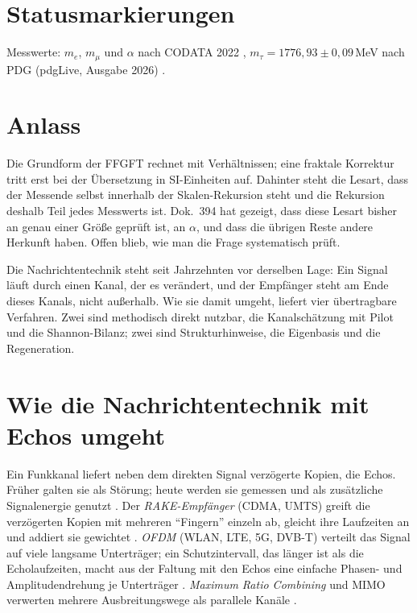 \section*{Statusmarkierungen}

Messwerte: $m_e$, $m_\mu$ und $\alpha$ nach CODATA 2022 \QM, $m_\tau=1776{,}93\pm0{,}09$\,MeV nach PDG
(pdgLive, Ausgabe 2026) \QM.

\section{Anlass}

Die Grundform der FFGFT rechnet mit Verhältnissen; eine fraktale Korrektur tritt erst bei der
Übersetzung in SI-Einheiten auf. Dahinter steht die Lesart, dass der Messende selbst innerhalb der
Skalen-Rekursion steht und die Rekursion deshalb Teil jedes Messwerts ist. Dok.~394 hat gezeigt, dass
diese Lesart bisher an genau einer Größe geprüft ist, an $\alpha$, und dass die übrigen Reste andere
Herkunft haben. Offen blieb, wie man die Frage systematisch prüft.

Die Nachrichtentechnik steht seit Jahrzehnten vor derselben Lage: Ein Signal läuft durch einen Kanal,
der es verändert, und der Empfänger steht am Ende dieses Kanals, nicht außerhalb. Wie sie damit
umgeht, liefert vier übertragbare Verfahren. Zwei sind methodisch direkt nutzbar, die Kanalschätzung
mit Pilot und die Shannon-Bilanz; zwei sind Strukturhinweise, die Eigenbasis und die Regeneration.

\section{Wie die Nachrichtentechnik mit Echos umgeht}

Ein Funkkanal liefert neben dem direkten Signal verzögerte Kopien, die Echos. Früher galten sie als
Störung; heute werden sie gemessen und als zusätzliche Signalenergie genutzt \QM. Der
\emph{RAKE-Empfänger} (CDMA, UMTS) greift die verzögerten Kopien mit mehreren \enquote{Fingern} einzeln
ab, gleicht ihre Laufzeiten an und addiert sie gewichtet \cite{PriceGreen1958}. \emph{OFDM} (WLAN, LTE,
5G, DVB-T) verteilt das Signal auf viele langsame Unterträger; ein Schutzintervall, das länger ist als
die Echolaufzeiten, macht aus der Faltung mit den Echos eine einfache Phasen- und Amplitudendrehung je
Unterträger \cite{WeinsteinEbert1971}. \emph{Maximum Ratio Combining} und MIMO verwerten mehrere
Ausbreitungswege als parallele Kanäle \cite{Brennan1959}.

